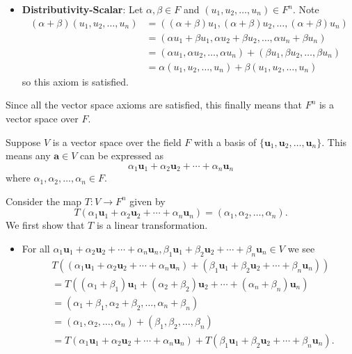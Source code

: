 \begin{questions}
\begin{itemize}
        \item \textbf{Distributivity-Scalar}: Let $\alpha, \beta \in F$ and $(u_1, u_2, \dots, u_n) \in F^n$. Note
        \begin{align*}
            (\alpha+\beta)(u_1, u_2, \dots, u_n) &= ((\alpha+\beta)u_1, (\alpha+\beta)u_2, \dots, (\alpha+\beta)u_n)\\
            &= (\alpha u_1 + \beta u_1, \alpha u_2 + \beta u_2, \dots, \alpha u_n + \beta u_n)\\
            &= (\alpha u_1, \alpha u_2, \dots, \alpha u_n) + (\beta u_1, \beta u_2, \dots, \beta u_n)\\
            &= \alpha(u_1, u_2, \dots, u_n) + \beta(u_1, u_2, \dots, u_n)
        \end{align*}
        so this axiom is satisfied.
    \end{itemize}
    Since all the vector space axioms are satisfied, this finally means that $F^n$ is a vector space over $F$.

    \item Suppose $V$ is a vector space over the field $F$ with a basis of $\{\textbf{u}_1, \textbf{u}_2, \dots, \textbf{u}_n\}$. This means any $\textbf{a} \in V$ can be expressed as
    \[
        \alpha_1\textbf{u}_1 + \alpha_2\textbf{u}_2 + \cdots + \alpha_n\textbf{u}_n
    \]
    where $\alpha_1,\alpha_2,\dots,\alpha_n \in F$.

    Consider the map $T: V \to F^n$ given by
    \[
        T( \alpha_1\textbf{u}_1 + \alpha_2\textbf{u}_2 + \cdots + \alpha_n\textbf{u}_n) = (\alpha_1, \alpha_2, \dots, \alpha_n).
    \]
    We first show that $T$ is a linear transformation.
    \begin{itemize}
        \item For all $\alpha_1\textbf{u}_1 + \alpha_2\textbf{u}_2 + \cdots + \alpha_n\textbf{u}_n, \beta_1\textbf{u}_1 + \beta_2\textbf{u}_2 + \cdots + \beta_n\textbf{u}_n \in V$ we see
        \begin{align*}
            &T((\alpha_1\textbf{u}_1 + \alpha_2\textbf{u}_2 + \cdots + \alpha_n\textbf{u}_n) + (\beta_1\textbf{u}_1 + \beta_2\textbf{u}_2 + \cdots + \beta_n\textbf{u}_n))\\
            &= T((\alpha_1 + \beta_1)\textbf{u}_1 + (\alpha_2 + \beta_2)\textbf{u}_2 + \cdots + (\alpha_n + \beta_n)\textbf{u}_n)\\
            &= (\alpha_1 + \beta_1, \alpha_2 + \beta_2, \dots, \alpha_n + \beta_n)\\
            &= (\alpha_1, \alpha_2, \dots, \alpha_n) + (\beta_1, \beta_2, \dots, \beta_n)\\
            &= T(\alpha_1\textbf{u}_1 + \alpha_2\textbf{u}_2 + \cdots + \alpha_n\textbf{u}_n) + T(\beta_1\textbf{u}_1 + \beta_2\textbf{u}_2 + \cdots + \beta_n\textbf{u}_n).
        \end{align*}


\end{itemize}
\end{questions}
